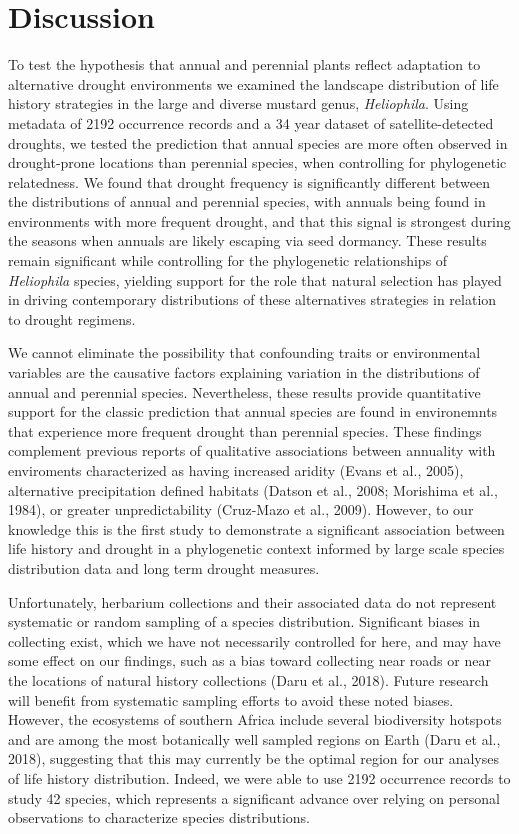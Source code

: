 \documentclass[man,floatsintext]{apa6}
\theoremstyle{definition}
\theoremstyle{definition}
\theoremstyle{definition}
\theoremstyle{remark}
\begin{document}
\hypertarget{discussion}{%
\section{Discussion}\label{discussion}}

To test the hypothesis that annual and perennial plants reflect
adaptation to alternative drought environments we examined the landscape
distribution of life history strategies in the large and diverse mustard
genus, \emph{Heliophila}. Using metadata of 2192 occurrence records and
a 34 year dataset of satellite-detected droughts, we tested the
prediction that annual species are more often observed in drought-prone
locations than perennial species, when controlling for phylogenetic
relatedness. We found that drought frequency is significantly different
between the distributions of annual and perennial species, with annuals
being found in environments with more frequent drought, and that this
signal is strongest during the seasons when annuals are likely escaping
via seed dormancy. These results remain significant while controlling
for the phylogenetic relationships of \emph{Heliophila} species,
yielding support for the role that natural selection has played in
driving contemporary distributions of these alternatives strategies in
relation to drought regimens.

We cannot eliminate the possibility that confounding traits or
environmental variables are the causative factors explaining variation
in the distributions of annual and perennial species. Nevertheless,
these results provide quantitative support for the classic prediction
that annual species are found in environemnts that experience more
frequent drought than perennial species. These findings complement
previous reports of qualitative associations between annuality with
enviroments characterized as having increased aridity (Evans et al.,
2005), alternative precipitation defined habitats (Datson et al., 2008;
Morishima et al., 1984), or greater unpredictability (Cruz-Mazo et al.,
2009). However, to our knowledge this is the first study to demonstrate
a significant association between life history and drought in a
phylogenetic context informed by large scale species distribution data
and long term drought measures.

Unfortunately, herbarium collections and their associated data do not
represent systematic or random sampling of a species distribution.
Significant biases in collecting exist, which we have not necessarily
controlled for here, and may have some effect on our findings, such as a
bias toward collecting near roads or near the locations of natural
history collections (Daru et al., 2018). Future research will benefit
from systematic sampling efforts to avoid these noted biases. However,
the ecosystems of southern Africa include several biodiversity hotspots
and are among the most botanically well sampled regions on Earth (Daru
et al., 2018), suggesting that this may currently be the optimal region
for our analyses of life history distribution. Indeed, we were able to
use 2192 occurrence records to study 42 species, which represents a
significant advance over relying on personal observations to
characterize species distributions.
\end{document}
